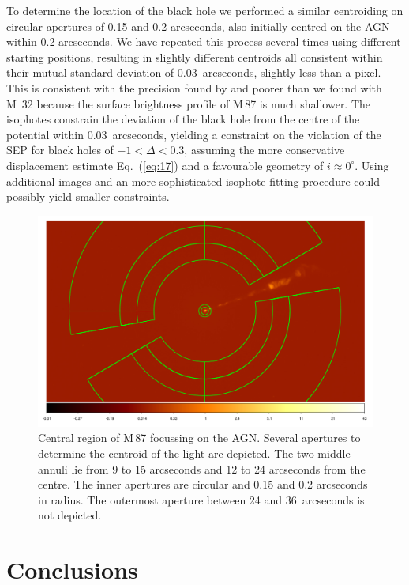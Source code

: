 \documentclass[useAMS,usenatbib]{mn2e}
\begin{document}
To determine the location of the black hole we performed a similar
centroiding on circular
apertures
of 0.15 and 0.2 arcseconds, also
initially centred on the AGN within 0.2 arcseconds.  We have repeated
this process several times using different starting positions,
resulting in slightly different centroids all consistent within their
mutual standard deviation of 0.03~arcseconds, slightly less than a
pixel.  This is consistent with the precision found by
\citet{2013ApJ...770...86W} and poorer than we found with M~32 because
the surface brightness profile of M\,87 is much shallower.  The
isophotes constrain the deviation of the black hole from the centre of
the potential within 0.03~arcseconds, yielding a constraint on
the violation of the SEP for black holes of $-1<\Delta<0.3$, assuming the
more conservative displacement estimate Eq.~(\ref{eq:17}) and a
favourable geometry of $i\approx 0^\circ$.  Using additional
images and an more sophisticated isophote fitting procedure could
possibly yield smaller constraints.
\begin{figure}
  \includegraphics[width=\columnwidth]{ds9.pdf}
  \caption{Central region of M\,87 focussing on the AGN.  Several
    apertures to determine the centroid of the light are depicted.
    The two middle annuli lie from 9 to 15 arcseconds and 12 to 24
    arcseconds from the centre.  The inner apertures are circular and
    0.15 and 0.2 arcseconds in radius. The outermost aperture between
    24 and 36~arcseconds is not depicted.}
  \label{fig:M87}
\end{figure}

\section{Conclusions}
\label{conclusions}
\end{document}
